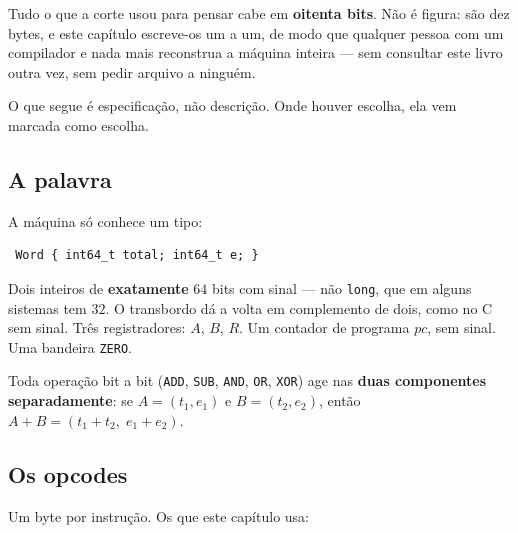\documentclass[11pt]{article}
\newcommand{\code}[1]{\texttt{\small #1}}
\theoremstyle{plain}
\theoremstyle{remark}
\begin{document}
Tudo o que a corte usou para pensar cabe em \textbf{oitenta bits}. Não é
figura: são dez bytes, e este capítulo escreve-os um a um, de modo que
qualquer pessoa com um compilador e nada mais reconstrua a máquina inteira ---
sem consultar este livro outra vez, sem pedir arquivo a ninguém.

O que segue é especificação, não descrição. Onde houver escolha, ela vem
marcada como escolha.

\subsection{A palavra}

A máquina só conhece um tipo:

\begin{verbatim}
 Word { int64_t total; int64_t e; }
\end{verbatim}

\noindent Dois inteiros de \textbf{exatamente} $64$ bits com sinal --- não
\code{long}, que em alguns sistemas tem $32$. O transbordo dá a volta em
complemento de dois, como no C sem sinal. Três registradores: $A$, $B$,
$R$. Um contador de programa $pc$, sem sinal. Uma bandeira \code{ZERO}.

Toda operação bit a bit (\code{ADD}, \code{SUB}, \code{AND}, \code{OR},
\code{XOR}) age nas \textbf{duas componentes separadamente}: se
$A=(t_1,e_1)$ e $B=(t_2,e_2)$, então $A+B=(t_1+t_2,\;e_1+e_2)$.

\subsection{Os opcodes}

Um byte por instrução. Os que este capítulo usa:
\end{document}
